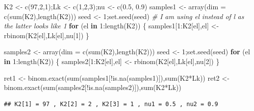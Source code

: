 \documentclass[
]{book}
\newenvironment{Shaded}{\begin{snugshade}}{\end{snugshade}}
\newcommand{\AttributeTok}[1]{\textcolor[rgb]{0.77,0.63,0.00}{#1}}
\newcommand{\CommentTok}[1]{\textcolor[rgb]{0.56,0.35,0.01}{\textit{#1}}}
\newcommand{\ControlFlowTok}[1]{\textcolor[rgb]{0.13,0.29,0.53}{\textbf{#1}}}
\newcommand{\DecValTok}[1]{\textcolor[rgb]{0.00,0.00,0.81}{#1}}
\newcommand{\FloatTok}[1]{\textcolor[rgb]{0.00,0.00,0.81}{#1}}
\newcommand{\FunctionTok}[1]{\textcolor[rgb]{0.00,0.00,0.00}{#1}}
\newcommand{\NormalTok}[1]{#1}
\newcommand{\OtherTok}[1]{\textcolor[rgb]{0.56,0.35,0.01}{#1}}
\newcommand{\SpecialCharTok}[1]{\textcolor[rgb]{0.00,0.00,0.00}{#1}}
\begin{document}
\begin{Shaded}
\begin{Highlighting}[]
\NormalTok{K2 }\OtherTok{\textless{}{-}} \FunctionTok{c}\NormalTok{(}\DecValTok{97}\NormalTok{,}\DecValTok{2}\NormalTok{,}\DecValTok{1}\NormalTok{);Lk }\OtherTok{\textless{}{-}} \FunctionTok{c}\NormalTok{(}\DecValTok{1}\NormalTok{,}\DecValTok{2}\NormalTok{,}\DecValTok{3}\NormalTok{);nu }\OtherTok{\textless{}{-}} \FunctionTok{c}\NormalTok{(}\FloatTok{0.5}\NormalTok{, }\FloatTok{0.9}\NormalTok{)}
\NormalTok{samples1 }\OtherTok{\textless{}{-}} \FunctionTok{array}\NormalTok{(}\AttributeTok{dim =} \FunctionTok{c}\NormalTok{(}\FunctionTok{sum}\NormalTok{(K2),}\FunctionTok{length}\NormalTok{(K2)))}
\NormalTok{seed }\OtherTok{\textless{}{-}} \DecValTok{1}\NormalTok{;}\FunctionTok{set.seed}\NormalTok{(seed)}
\CommentTok{\# I am using el instead of l as the latter looks like 1}
\ControlFlowTok{for}\NormalTok{ (el }\ControlFlowTok{in} \DecValTok{1}\SpecialCharTok{:}\FunctionTok{length}\NormalTok{(K2)) \{}
\NormalTok{  samples1[}\DecValTok{1}\SpecialCharTok{:}\NormalTok{K2[el],el] }\OtherTok{\textless{}{-}} \FunctionTok{rbinom}\NormalTok{(K2[el],Lk[el],nu[}\DecValTok{1}\NormalTok{])}
\NormalTok{\}}

\NormalTok{samples2 }\OtherTok{\textless{}{-}} \FunctionTok{array}\NormalTok{(}\AttributeTok{dim =} \FunctionTok{c}\NormalTok{(}\FunctionTok{sum}\NormalTok{(K2),}\FunctionTok{length}\NormalTok{(K2)))}
\NormalTok{seed }\OtherTok{\textless{}{-}} \DecValTok{1}\NormalTok{;}\FunctionTok{set.seed}\NormalTok{(seed)}
\ControlFlowTok{for}\NormalTok{ (el }\ControlFlowTok{in} \DecValTok{1}\SpecialCharTok{:}\FunctionTok{length}\NormalTok{(K2)) \{}
\NormalTok{  samples2[}\DecValTok{1}\SpecialCharTok{:}\NormalTok{K2[el],el] }\OtherTok{\textless{}{-}} \FunctionTok{rbinom}\NormalTok{(K2[el],Lk[el],nu[}\DecValTok{2}\NormalTok{])}
\NormalTok{\}}

\NormalTok{ret1 }\OtherTok{\textless{}{-}} \FunctionTok{binom.exact}\NormalTok{(}\FunctionTok{sum}\NormalTok{(samples1[}\SpecialCharTok{!}\FunctionTok{is.na}\NormalTok{(samples1)]),}\FunctionTok{sum}\NormalTok{(K2}\SpecialCharTok{*}\NormalTok{Lk))}
\NormalTok{ret2 }\OtherTok{\textless{}{-}} \FunctionTok{binom.exact}\NormalTok{(}\FunctionTok{sum}\NormalTok{(samples2[}\SpecialCharTok{!}\FunctionTok{is.na}\NormalTok{(samples2)]),}\FunctionTok{sum}\NormalTok{(K2}\SpecialCharTok{*}\NormalTok{Lk))}
\end{Highlighting}
\end{Shaded}

\begin{verbatim}
## K2[1] = 97 , K2[2] = 2 , K2[3] = 1 , nu1 = 0.5 , nu2 = 0.9
\end{verbatim}
\end{document}
